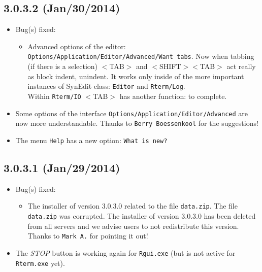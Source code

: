\subsection*{3.0.3.2 (Jan/30/2014)}
\begin{itemize}
  \item Bug(s) fixed:
    \begin{itemize}
      \item Advanced options of the editor: \texttt{Options/Application/Editor/Advanced/Want tabs}.
       Now when tabbing (if there is a selection) $<$TAB$>$ and $<$SHIFT$>$$<$TAB$>$ act really as block indent, unindent.
       It works only inside of the more important instances of SynEdit class: \texttt{Editor} and \texttt{Rterm/Log}. \\
       Within \texttt{Rterm/IO} $<$TAB$>$ has another function: to complete.
    \end{itemize}
  \item Some options of the interface \texttt{Options/Application/Editor/Advanced} are now more understandable.
   Thanks to \texttt{Berry Boessenkool} for the suggestions!
  \item The menu \texttt{Help} has a new option: \texttt{What is new?}
\end{itemize}


\subsection*{3.0.3.1 (Jan/29/2014)}
\begin{itemize}
  \item Bug(s) fixed:
    \begin{itemize}
      \item The installer of version 3.0.3.0 related to the file \texttt{data.zip}.
       The file \texttt{data.zip} was corrupted. The installer of version 3.0.3.0 has been deleted from all servers
       and we advise users to not redistribute this version. Thanks to \texttt{Mark A.} for pointing it out!
    \end{itemize}
  \item The \textit{STOP} button is working again for \texttt{Rgui.exe} (but is not active for \texttt{Rterm.exe} yet).
\end{itemize}


